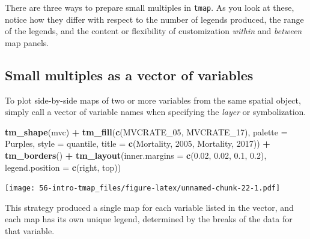 \documentclass[
]{book}
\newenvironment{Shaded}{\begin{snugshade}}{\end{snugshade}}
\newcommand{\AttributeTok}[1]{\textcolor[rgb]{0.13,0.29,0.53}{#1}}
\newcommand{\FloatTok}[1]{\textcolor[rgb]{0.00,0.00,0.81}{#1}}
\newcommand{\FunctionTok}[1]{\textcolor[rgb]{0.13,0.29,0.53}{\textbf{#1}}}
\newcommand{\NormalTok}[1]{#1}
\newcommand{\SpecialCharTok}[1]{\textcolor[rgb]{0.81,0.36,0.00}{\textbf{#1}}}
\newcommand{\StringTok}[1]{\textcolor[rgb]{0.31,0.60,0.02}{#1}}
\newenvironment{rmdnote}[1]
  {
  \begin{itemize}
  \renewcommand{\labelitemi}{
    \raisebox{-.7\height}[0pt][0pt]{
      {\setkeys{Gin}{width=3em,keepaspectratio}\texttt{[image: images/\#1]}}
    }
  }
  \setlength{\fboxsep}{1em}
  \begin{note}
  \item
  }
  {
  \end{note}
  \end{itemize}
  }
\begin{document}
There are three ways to prepare small multiples in \texttt{tmap}. As you look at these, notice how they differ with respect to the number of legends produced, the range of the legends, and the content or flexibility of customization \emph{within} and \emph{between} map panels.

\hypertarget{small-multiples-as-a-vector-of-variables}{%
\subsection{Small multiples as a vector of variables}\label{small-multiples-as-a-vector-of-variables}}

To plot side-by-side maps of two or more variables from the same spatial object, simply call a vector of variable names when specifying the \emph{layer} or symbolization.

\begin{Shaded}
\begin{Highlighting}[]
\FunctionTok{tm\_shape}\NormalTok{(mvc) }\SpecialCharTok{+} 
  \FunctionTok{tm\_fill}\NormalTok{(}\FunctionTok{c}\NormalTok{(}\StringTok{\textquotesingle{}MVCRATE\_05\textquotesingle{}}\NormalTok{, }\StringTok{\textquotesingle{}MVCRATE\_17\textquotesingle{}}\NormalTok{),}
          \AttributeTok{palette =} \StringTok{\textquotesingle{}Purples\textquotesingle{}}\NormalTok{,}
          \AttributeTok{style =} \StringTok{\textquotesingle{}quantile\textquotesingle{}}\NormalTok{,}
          \AttributeTok{title =} \FunctionTok{c}\NormalTok{(}\StringTok{\textquotesingle{}Mortality, 2005\textquotesingle{}}\NormalTok{, }\StringTok{\textquotesingle{}Mortality, 2017\textquotesingle{}}\NormalTok{)) }\SpecialCharTok{+}
  \FunctionTok{tm\_borders}\NormalTok{() }\SpecialCharTok{+}
  \FunctionTok{tm\_layout}\NormalTok{(}\AttributeTok{inner.margins =} \FunctionTok{c}\NormalTok{(}\FloatTok{0.02}\NormalTok{, }\FloatTok{0.02}\NormalTok{, }\FloatTok{0.1}\NormalTok{, }\FloatTok{0.2}\NormalTok{),}
            \AttributeTok{legend.position =} \FunctionTok{c}\NormalTok{(}\StringTok{\textquotesingle{}right\textquotesingle{}}\NormalTok{, }\StringTok{\textquotesingle{}top\textquotesingle{}}\NormalTok{))}
\end{Highlighting}
\end{Shaded}

\texttt{[image: 56-intro-tmap\_files/figure-latex/unnamed-chunk-22-1.pdf]}

\begin{rmdnote}{note}
This strategy produced a single map for each variable listed in the vector, and each map has its own unique legend, determined by the breaks of the data for that variable.

\end{rmdnote}
\end{document}
